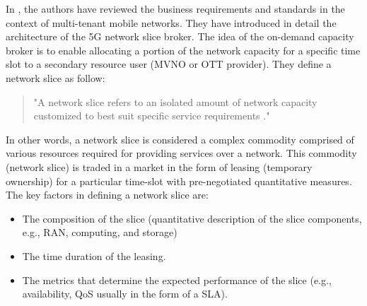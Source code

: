 In \cite{7514161}, the authors have reviewed the business requirements and standards in the context of multi-tenant mobile networks. They have introduced in detail the architecture of the 5G network slice broker. The idea of the on-demand capacity broker is to enable allocating a portion of the network capacity for a specific time slot to a secondary resource user (\ac{MVNO} or \ac{OTT} provider). They define a network slice as follow:
\begin{quote}
    "A network slice refers to an isolated amount of network capacity customized to best suit specific service requirements \cite{7514161}."
\end{quote}
In other words, a network slice is considered a complex commodity comprised of various resources required for providing services over a network. This commodity (network slice) is traded in a market in the form of leasing (temporary ownership) for a particular time-slot with pre-negotiated quantitative measures. The key factors in defining a network slice are:
\begin{itemize}
    \item The composition of the slice (quantitative description of the slice components, e.g., \ac{RAN}, computing, and storage)
    \item The time duration of the leasing.
    \item The metrics that determine the expected performance of the slice (e.g., availability, \ac{QoS} usually in the form of a \ac{SLA}).
\end{itemize}


